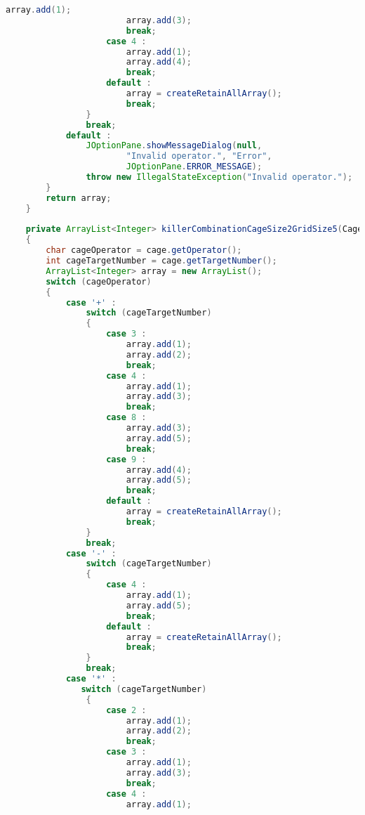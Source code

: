 \begin{lstlisting}[language=Java,basicstyle=\tiny,caption=SolverRuleBased.java]
                        array.add(1);
                        array.add(3);
                        break;
                    case 4 :
                        array.add(1);
                        array.add(4);
                        break;
                    default :
                        array = createRetainAllArray();
                        break;
                }
                break;
            default :
                JOptionPane.showMessageDialog(null, 
                        "Invalid operator.", "Error", 
                        JOptionPane.ERROR_MESSAGE);
                throw new IllegalStateException("Invalid operator.");
        }
        return array;
    }
    
    private ArrayList<Integer> killerCombinationCageSize2GridSize5(Cage cage)
    {
        char cageOperator = cage.getOperator();
        int cageTargetNumber = cage.getTargetNumber();
        ArrayList<Integer> array = new ArrayList();
        switch (cageOperator)
        {
            case '+' :
                switch (cageTargetNumber)
                {
                    case 3 :
                        array.add(1);
                        array.add(2);
                        break;
                    case 4 :  
                        array.add(1);
                        array.add(3);
                        break;
                    case 8 :
                        array.add(3);
                        array.add(5);
                        break;
                    case 9 :
                        array.add(4);
                        array.add(5);
                        break;
                    default :
                        array = createRetainAllArray();
                        break;
                }
                break;
            case '-' :
                switch (cageTargetNumber)
                {
                    case 4 :
                        array.add(1);
                        array.add(5);
                        break;
                    default :
                        array = createRetainAllArray();
                        break;
                }
                break;
            case '*' :
               switch (cageTargetNumber)
                {
                    case 2 :
                        array.add(1);
                        array.add(2);
                        break;
                    case 3 :
                        array.add(1);
                        array.add(3);
                        break;
                    case 4 :
                        array.add(1);

\end{lstlisting}
